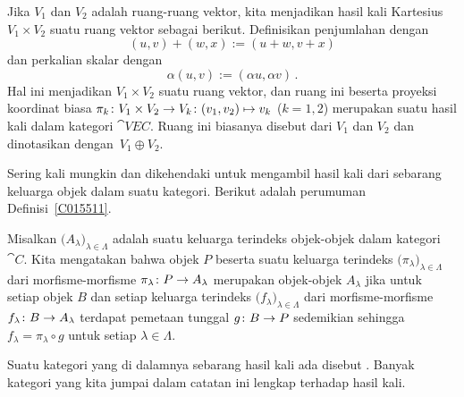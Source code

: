 \begin{exam}\label{C015521} Jika $V_1$ dan $V_2$ adalah ruang-ruang vektor, kita menjadikan hasil kali Kartesius
$V_1 \times V_2$ suatu ruang vektor sebagai berikut. Definisikan penjumlahan dengan
  \[ (u,v) + (w,x) := (u + w, v + x)  \]
dan perkalian skalar dengan
  \[ \alpha (u,v) := (\alpha u, \alpha v) \,. \]
Hal ini menjadikan $V_1 \times V_2$ suatu ruang vektor, dan ruang ini beserta
proyeksi koordinat biasa $\pi_k\colon V_1 \times V_2 \rightarrow V_k \colon (v_1,v_2)
\mapsto v_k$ ($k = 1,2$) merupakan
suatu hasil kali dalam kategori $\cat{VEC}$. Ruang ini biasanya disebut
 dari $V_1$ dan $V_2$ dan dinotasikan dengan~$V_1 \oplus V_2$.
\end{exam}

Sering kali mungkin dan dikehendaki untuk mengambil hasil kali dari sebarang keluarga objek dalam
suatu kategori. Berikut adalah perumuman Definisi~\ref{C015511}.

\begin{defn}\label{C015524} Misalkan $\bigl(A_\lambda\bigr)_{\lambda \in \Lambda}$ adalah suatu
keluarga terindeks objek-objek dalam kategori~$\cat C$. Kita mengatakan bahwa objek $P$ beserta
suatu keluarga terindeks $\bigl(\pi_\lambda\bigr)_{\lambda \in \Lambda}$ dari morfisme-morfisme
$\pi_\lambda\colon P \rightarrow A_\lambda$ merupakan
 objek-objek $A_\lambda$ jika untuk setiap objek $B$ dan setiap keluarga terindeks
$\bigl(f_\lambda\bigr)_{\lambda \in \Lambda}$ dari morfisme-morfisme $f_\lambda\colon B \rightarrow
A_\lambda$ terdapat pemetaan tunggal $g \colon B \rightarrow P$ sedemikian sehingga $f_\lambda =
\pi_\lambda \circ g$ untuk setiap $\lambda \in \Lambda$.
\end{defn}

Suatu kategori yang di dalamnya sebarang hasil kali ada disebut
. Banyak kategori yang kita jumpai dalam catatan ini lengkap
terhadap hasil kali.

